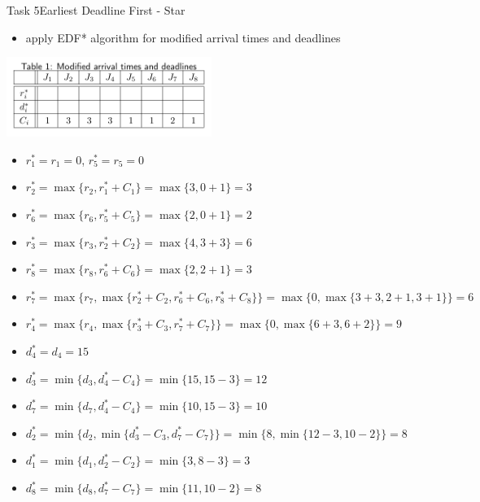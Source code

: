 \begin{frame}[allowframebreaks]{Task 5}{Earliest Deadline First - Star\vspace{0.5cm}}
  \begin{tasknoinc}
    \begin{itemize}
      \item apply \alert{EDF* algorithm} for \alert{modified arrival times} and \alert{deadlines}
    \end{itemize}
    \centering
    \includegraphics[width=0.5\textwidth]{./figures/5_table.png}
  \end{tasknoinc}
  \framebreak
    \begin{itemize}
        \item $r_1^* = r_1 = 0$, $r_5^* = r_5 = 0$
        \item $r_2^* = \max\{r_2,r_1^* + C_1\} = \max\{3, 0+1\} = 3$
        \item $r_6^* = \max\{r_6,r_5^* + C_5\} = \max\{2, 0+1\} = 2$
        \item $r_3^* = \max\{r_3, r_2^* + C_2\} = \max\{4, 3 + 3\} = 6$
        \item $r_8^* = \max\{r_8, r_6^* + C_6\} = \max\{2, 2 + 1\} = 3$
        \item $r_7^* = \max\{r_7,\max\{r_2^* + C_2, r_6^* + C_6, r_8^* + C_8\}\} = \max\{0, \max\{3 + 3, 2 + 1, 3 + 1\}\} = 6$
        \item $r_4^* = \max\{r_4,\max\{r_3^* + C_3, r_7^* + C_7\}\} = \max\{0, \max\{6 + 3, 6 + 2\}\} = 9$
    \end{itemize}
    \framebreak
    \begin{itemize}
        \item $d_4^* = d_4 = 15$
        \item $d_3^* = \min\{d_3, d_4^* - C_4\} = \min\{15, 15 - 3\} = 12$
        \item $d_7^* = \min\{d_7, d_4^* - C_4\} = \min\{10, 15 - 3\} = 10$
        \item $d_2^* = \min\{d_2, \min\{d_3^* - C_3, d_7^* - C_7\}\} = \min\{8, \min\{12-3, 10-2\}\} = 8$
        \item $d_1^* = \min\{d_1, d_2^* - C_2\} = \min\{3, 8 - 3\} = 3$
        \item $d_8^* = \min\{d_8, d_7^* - C_7\} = \min\{11, 10 - 2\} = 8$

\end{itemize}
\end{frame}
